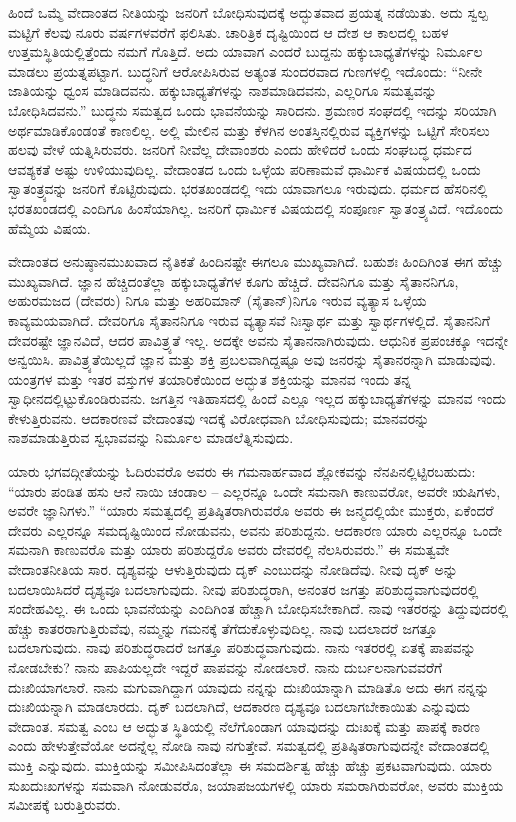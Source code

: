 ಹಿಂದೆ ಒಮ್ಮೆ ವೇದಾಂತದ ನೀತಿಯನ್ನು ಜನರಿಗೆ ಬೋಧಿಸುವುದಕ್ಕೆ ಅದ್ಭುತವಾದ ಪ್ರಯತ್ನ ನಡೆಯಿತು. ಅದು ಸ್ವಲ್ಪ ಮಟ್ಟಿಗೆ ಕೆಲವು ನೂರು ವರ್ಷಗಳವರೆಗೆ ಫಲಿಸಿತು. ಚಾರಿತ್ರಿಕ ದೃಷ್ಟಿಯಿಂದ ಆ ದೇಶ ಆ ಕಾಲದಲ್ಲಿ ಬಹಳ ಉತ್ತಮಸ್ಥಿತಿಯಲ್ಲಿತ್ತೆಂದು ನಮಗೆ ಗೊತ್ತಿದೆ. ಅದು ಯಾವಾಗ ಎಂದರೆ ಬುದ್ದನು ಹಕ್ಕುಬಾಧ್ಯತೆಗಳನ್ನು ನಿರ್ಮೂಲ ಮಾಡಲು ಪ್ರಯತ್ನಪಟ್ಟಾಗ. ಬುದ್ಧನಿಗೆ ಆರೋಪಿಸಿರುವ ಅತ್ಯಂತ ಸುಂದರವಾದ ಗುಣಗಳಲ್ಲಿ ಇದೊಂದು: “ನೀನೇ ಜಾತಿಯನ್ನು ಧ್ವಂಸ ಮಾಡಿದವನು. ಹಕ್ಕುಬಾಧ್ಯತೆಗಳನ್ನು ನಾಶಮಾಡಿದವನು, ಎಲ್ಲರಿಗೂ ಸಮತ್ವವನ್ನು ಬೋಧಿಸಿದವನು.” ಬುದ್ಧನು ಸಮತ್ವದ ಒಂದು ಭಾವನೆಯನ್ನು ಸಾರಿದನು. ಶ್ರಮಣರ ಸಂಘದಲ್ಲಿ ಇದನ್ನು ಸರಿಯಾಗಿ ಅರ್ಥಮಾಡಿಕೊಂಡಂತೆ ಕಾಣಲಿಲ್ಲ. ಅಲ್ಲಿ ಮೇಲಿನ ಮತ್ತು ಕೆಳಗಿನ ಅಂತಸ್ತಿನಲ್ಲಿರುವ ವ್ಯಕ್ತಿಗಳನ್ನು ಒಟ್ಟಿಗೆ ಸೇರಿಸಲು ಹಲವು ವೇಳೆ ಯತ್ನಿಸಿರುವರು. ಜನರಿಗೆ ನೀವೆಲ್ಲ ದೇವಾಂಶರು ಎಂದು ಹೇಳಿದರೆ ಒಂದು ಸಂಘಬದ್ಧ ಧರ್ಮದ ಆವಶ್ಯಕತೆ ಅಷ್ಟು ಉಳಿಯುವುದಿಲ್ಲ. ವೇದಾಂತದ ಒಂದು ಒಳ್ಳೆಯ ಪರಿಣಾಮವೆ ಧಾರ್ಮಿಕ ವಿಷಯದಲ್ಲಿ ಒಂದು ಸ್ವಾತಂತ್ರ್ಯವನ್ನು ಜನರಿಗೆ ಕೊಟ್ಟಿರುವುದು. ಭರತಖಂಡದಲ್ಲಿ ಇದು ಯಾವಾಗಲೂ ಇರುವುದು. ಧರ್ಮದ ಹೆಸರಿನಲ್ಲಿ ಭರತಖಂಡದಲ್ಲಿ ಎಂದಿಗೂ ಹಿಂಸೆಯಾಗಿಲ್ಲ. ಜನರಿಗೆ ಧಾರ್ಮಿಕ ವಿಷಯದಲ್ಲಿ ಸಂಪೂರ್ಣ ಸ್ವಾತಂತ್ರ್ಯವಿದೆ. ಇದೊಂದು ಹೆಮ್ಮೆಯ ವಿಷಯ.

ವೇದಾಂತದ ಅನುಷ್ಠಾನಮುಖವಾದ ನೈತಿಕತೆ ಹಿಂದಿನಷ್ಟೇ ಈಗಲೂ ಮುಖ್ಯವಾಗಿದೆ. ಬಹುಶಃ ಹಿಂದಿಗಿಂತ ಈಗ ಹೆಚ್ಚು ಮುಖ್ಯವಾಗಿದೆ. ಜ್ಞಾನ ಹೆಚ್ಚಿದಂತೆಲ್ಲಾ ಹಕ್ಕುಬಾಧ್ಯತೆಗಳ ಕೂಗು ಹೆಚ್ಚಿದೆ. ದೇವನಿಗೂ ಮತ್ತು ಸೈತಾನನಿಗೂ, ಅಹುರಮಜದ (ದೇವರು) ನಿಗೂ ಮತ್ತು ಅಹರಿಮಾನ್ (ಸೈತಾನ್)ನಿಗೂ ಇರುವ ವ್ಯತ್ಯಾಸ ಒಳ್ಳೆಯ ಕಾವ್ಯಮಯವಾಗಿದೆ. ದೇವರಿಗೂ ಸೈತಾನನಿಗೂ ಇರುವ ವ್ಯತ್ಯಾಸವೆ ನಿಃಸ್ವಾರ್ಥ ಮತ್ತು ಸ್ವಾರ್ಥಗಳಲ್ಲಿದೆ. ಸೈತಾನನಿಗೆ ದೇವರಷ್ಟೇ ಜ್ಞಾನವಿದೆ, ಆದರ ಪಾವಿತ್ರ್ಯತೆ ಇಲ್ಲ. ಅದಕ್ಕೇ ಅವನು ಸೈತಾನನಾಗಿರುವುದು. ಆಧುನಿಕ ಪ್ರಪಂಚಕ್ಕೂ ಇದನ್ನೇ ಅನ್ವಯಿಸಿ. ಪಾವಿತ್ರ್ಯತೆಯಿಲ್ಲದೆ ಜ್ಞಾನ ಮತ್ತು ಶಕ್ತಿ ಪ್ರಬಲವಾಗಿದ್ದಷ್ಟೂ ಅವು ಜನರನ್ನು ಸೈತಾನರನ್ನಾಗಿ ಮಾಡುವುವು. ಯಂತ್ರಗಳ ಮತ್ತು ಇತರ ವಸ್ತುಗಳ ತಯಾರಿಕೆಯಿಂದ ಅದ್ಭುತ ಶಕ್ತಿಯನ್ನು ಮಾನವ ಇಂದು ತನ್ನ ಸ್ವಾಧೀನದಲ್ಲಿಟ್ಟುಕೊಂಡಿರುವನು. ಜಗತ್ತಿನ ಇತಿಹಾಸದಲ್ಲಿ ಹಿಂದೆ ಎಲ್ಲೂ ಇಲ್ಲದ ಹಕ್ಕುಬಾಧ್ಯತೆಗಳನ್ನು ಮಾನವ ಇಂದು ಕೇಳುತ್ತಿರುವನು. ಆದಕಾರಣವೆ ವೇದಾಂತವು ಇದಕ್ಕೆ ವಿರೋಧವಾಗಿ ಬೋಧಿಸುವುದು; ಮಾನವರನ್ನು ನಾಶಮಾಡುತ್ತಿರುವ ಸ್ವಭಾವವನ್ನು ನಿರ್ಮೂಲ ಮಾಡಲೆತ್ನಿಸುವುದು.

ಯಾರು ಭಗವದ್ಗೀತೆಯನ್ನು ಓದಿರುವರೊ ಅವರು ಈ ಗಮನಾರ್ಹವಾದ ಶ್ಲೋಕವನ್ನು ನೆನಪಿನಲ್ಲಿಟ್ಟಿರಬಹುದು: “ಯಾರು ಪಂಡಿತ ಹಸು ಆನೆ ನಾಯಿ ಚಂಡಾಲ – ಎಲ್ಲರನ್ನೂ ಒಂದೇ ಸಮನಾಗಿ ಕಾಣುವರೋ, ಅವರೇ ಋಷಿಗಳು, ಅವರೇ ಜ್ಞಾನಿಗಳು.” “ಯಾರು ಸಮತ್ವದಲ್ಲಿ ಪ್ರತಿಷ್ಠಿತರಾಗಿರುವರೊ ಅವರು ಈ ಜನ್ಮದಲ್ಲಿಯೇ ಮುಕ್ತರು, ಏಕೆಂದರೆ ದೇವರು ಎಲ್ಲರನ್ನೂ ಸಮದೃಷ್ಟಿಯಿಂದ ನೋಡುವನು, ಅವನು ಪರಿಶುದ್ದನು. ಆದಕಾರಣ ಯಾರು ಎಲ್ಲರನ್ನೂ ಒಂದೇ ಸಮನಾಗಿ ಕಾಣುವರೊ ಮತ್ತು ಯಾರು ಪರಿಶುದ್ದರೊ ಅವರು ದೇವರಲ್ಲಿ ನೆಲಸಿರುವರು.” ಈ ಸಮತ್ವವೇ ವೇದಾಂತನೀತಿಯ ಸಾರ. ದೃಶ್ಯವನ್ನು ಆಳುತ್ತಿರುವುದು ದೃಕ್ ಎಂಬುದನ್ನು ನೋಡಿದೆವು. ನೀವು ದೃಕ್ ಅನ್ನು ಬದಲಾಯಿಸಿದರೆ ದೃಶ್ಯವೂ ಬದಲಾಗುವುದು. ನೀವು ಪರಿಶುದ್ಧರಾಗಿ, ಅನಂತರ ಜಗತ್ತು ಪರಿಶುದ್ಧವಾಗುವುದರಲ್ಲಿ ಸಂದೇಹವಿಲ್ಲ. ಈ ಒಂದು ಭಾವನೆಯನ್ನು ಎಂದಿಗಿಂತ ಹೆಚ್ಚಾಗಿ ಬೋಧಿಸಬೇಕಾಗಿದೆ. ನಾವು ಇತರರನ್ನು ತಿದ್ದುವುದರಲ್ಲಿ ಹೆಚ್ಚು ಕಾತರರಾಗುತ್ತಿರುವೆವು, ನಮ್ಮನ್ನು ಗಮನಕ್ಕೆ ತೆಗೆದುಕೊಳ್ಳುವುದಿಲ್ಲ. ನಾವು ಬದಲಾದರೆ ಜಗತ್ತೂ ಬದಲಾಗುವುದು. ನಾವು ಪರಿಶುದ್ಧರಾದರೆ ಜಗತ್ತೂ ಪರಿಶುದ್ಧವಾಗುವುದು. ನಾನು ಇತರರಲ್ಲಿ ಏತಕ್ಕೆ ಪಾಪವನ್ನು ನೋಡಬೇಕು? ನಾನು ಪಾಪಿಯಲ್ಲದೇ ಇದ್ದರೆ ಪಾಪವನ್ನು ನೋಡಲಾರೆ. ನಾನು ದುರ್ಬಲನಾಗುವವರೆಗೆ ದುಃಖಿಯಾಗಲಾರೆ. ನಾನು ಮಗುವಾಗಿದ್ದಾಗ ಯಾವುದು ನನ್ನನ್ನು ದುಃಖಿಯಾನ್ನಾಗಿ ಮಾಡಿತೊ ಅದು ಈಗ ನನ್ನನ್ನು ದುಃಖಿಯನ್ನಾಗಿ ಮಾಡಲಾರದು. ದೃಕ್ ಬದಲಾಗಿದೆ, ಆದಕಾರಣ ದೃಶ್ಯವೂ ಬದಲಾಗಬೇಕಾಯಿತು ಎನ್ನುವುದು ವೇದಾಂತ. ಸಮತ್ವ ಎಂಬ ಆ ಅದ್ಭುತ ಸ್ಥಿತಿಯಲ್ಲಿ ನೆಲೆಗೊಂಡಾಗ ಯಾವುದನ್ನು ದುಃಖಕ್ಕೆ ಮತ್ತು ಪಾಪಕ್ಕೆ ಕಾರಣ ಎಂದು ಹೇಳುತ್ತೇವೆಯೋ ಅದನ್ನೆಲ್ಲ ನೋಡಿ ನಾವು ನಗುತ್ತೇವೆ. ಸಮತ್ವದಲ್ಲಿ ಪ್ರತಿಷ್ಠಿತರಾಗುವುದನ್ನೇ ವೇದಾಂತದಲ್ಲಿ ಮುಕ್ತಿ ಎನ್ನುವುದು. ಮುಕ್ತಿಯನ್ನು ಸಮೀಪಿಸಿದಂತೆಲ್ಲಾ ಈ ಸಮದರ್ಶಿತ್ವ ಹೆಚ್ಚು ಹೆಚ್ಚು ಪ್ರಕಟವಾಗುವುದು. ಯಾರು ಸುಖದುಃಖಗಳನ್ನು ಸಮವಾಗಿ ನೋಡುವರೊ, ಜಯಾಪಜಯಗಳಲ್ಲಿ ಯಾರು ಸಮರಾಗಿರುವರೋ, ಅವರು ಮುಕ್ತಿಯ ಸಮೀಪಕ್ಕೆ ಬರುತ್ತಿರುವರು.

